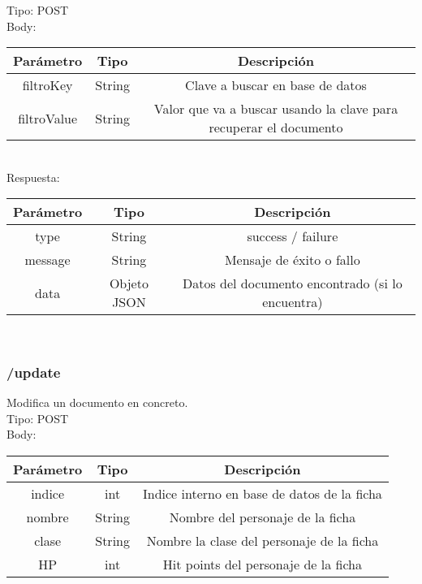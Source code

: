\documentclass[a4paper,12pt]{article}
\begin{document}
Tipo: POST\\

Body:\\

\begin{tabular}{|c|c|c|}
    \hline
    \textbf{Parámetro} & \textbf{Tipo}  & \textbf{Descripción}\\ 
    \hline
    filtroKey & String & Clave a buscar en base de datos\\ 
    \hline
    filtroValue & String & Valor que va a buscar usando la clave para recuperar el documento\\ 
    \hline
\end{tabular}\\

Respuesta:\\

\begin{tabular}{|c|c|c|}
    \hline
    \textbf{Parámetro} & \textbf{Tipo}  & \textbf{Descripción}\\ 
    \hline
    type & String & success / failure\\ 
    \hline
    message & String & Mensaje de éxito o fallo\\ 
    \hline
    data & Objeto JSON & Datos del documento encontrado (si lo encuentra)\\ 
    \hline
\end{tabular}\\

\subsubsection{/update}
Modifica un documento en concreto.\\

Tipo: POST\\

Body:\\

\begin{tabular}{|c|c|c|}
    \hline
    \textbf{Parámetro} & \textbf{Tipo}  & \textbf{Descripción}\\ 
    \hline
    indice & int & Indice interno en base de datos de la ficha\\ 
    \hline
    nombre & String & Nombre del personaje de la ficha\\ 
    \hline
    clase & String & Nombre la clase del personaje de la ficha\\ 
    \hline
    HP & int & Hit points del personaje de la ficha\\ 
    \hline
\end{tabular}\\
\end{document}
